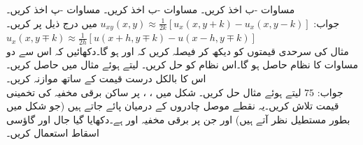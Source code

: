 \quad
مساوات -ب اخذ کریں۔
\quad
مساوات -ب اخذ کریں۔
\quad
مساوات -پ اخذ کریں۔\\
جواب:\quad
$u_{xy}(x,y)\approx \tfrac{1}{2k}[u_x(x,y+k)-u_x(x,y-k)]$
میں درج ذیل پر کریں۔\\
$u_x(x,y\mp k)\approx \tfrac{1}{2h}[u(x+h,y\mp k)-u(x-h,y\mp k)]$
\quad {}\\
مثال  کی سرحدی قیمتوں کو دیکھ کر فیصلہ کریں کہ  اور  ہو گا۔دکھائیں کہ اس سے دو مساوات کا نظام حاصل ہو گا۔اس نظام کو حل کریں۔
\quad
{} لیتے ہوئے مثال  میں  حاصل کریں۔اس کا بالکل درست قیمت  کے ساتھ موازنہ کریں۔\\
جواب:\quad
$75$
\quad
{} لیتے ہوئے مثال  حل کریں۔
\quad
شکل  میں ، ،  پر ساکن برقی مخفیہ کی تخمینی قیمت تلاش کریں۔یہ نقطے موصل چادروں کے درمیان پائے جاتے ہیں (جو شکل میں بطور مستطیل نظر آتے ہیں) اور جن پر برقی مخفیہ  اور  ہے۔دکھایا گیا جال اور گاؤسی اسقاط استعمال کریں۔
